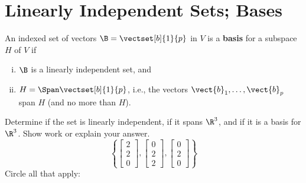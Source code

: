 

\setcounter{section}{2}
\section{Linearly Independent Sets; Bases}
\name[2in]


\begin{boxdef}
An indexed set of vectors $\B=\vectset[b]{1}{p}$ in $V$ is a \textbf{basis} for a subspace $H$ of $V$ if
\begin{enumerate}[(i)]
	\item $\B$ is a linearly independent set, and
	\item $H=\Span\vectset[b]{1}{p}$, i.e., the vectors $\vect{b}_1,\ldots,\vect{b}_p$ span $H$ (and no more than $H$).
\end{enumerate}
\end{boxdef}


\begin{exercise} %
	Determine if the set is linearly independent, if it spans $\R^3$, and if it is a basis for $\R^3$. Show work or explain your answer.
	$$ \left\{
	\begin{bmatrix}2\\2\\0\end{bmatrix},
	\begin{bmatrix}0\\2\\2\end{bmatrix},
	\begin{bmatrix}0\\2\\0\end{bmatrix}
	\right\} $$
	Circle all that apply:
	\begin{center}
	 \hspace{5em}
	 \hspace{5em}
	\end{center}
\end{exercise}
\vfill


